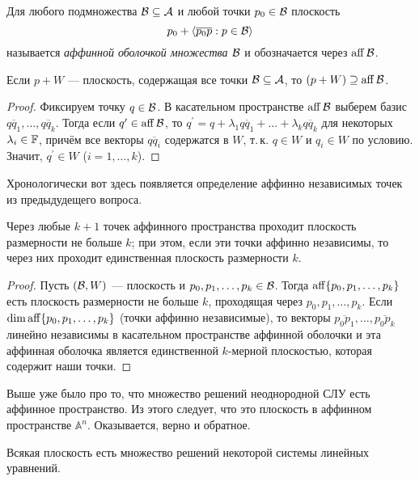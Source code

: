 \begin{definition}
    Для любого подмножества $\mathcal{B} \subseteq \mathcal{A}$ и любой точки $p_0 \in \mathcal{B}$ плоскость
    \[
        p_0 + \langle\overline{p_0p} : p \in \mathcal{B}\rangle
    \]
    называется \textit{аффинной оболочкой множества $\mathcal{B}$} и обозначается через $\operatorname{aff}\mathcal{B}$.
\end{definition}

\begin{proposal}
    Если $p + W$ --- плоскость, содержащая все точки $\mathcal{B} \subseteq \mathcal{A}$, то $(p + W) \supseteq \operatorname{aff}\mathcal{B}$.
\end{proposal}

\begin{proof}
    Фиксируем точку $q \in \mathcal{B}$. В касательном пространстве $\operatorname{aff}\mathcal{B}$ выберем базис $\overline{qq_1}, \ldots, \overline{qq_k}$. Тогда если $q^\prime \in \operatorname{aff}\mathcal{B}$, то $q^\prime = q + \lambda_1\overline{qq_1} + \ldots + \lambda_k\overline{qq_k}$ для некоторых $\lambda_i \in \mathbb{F}$, причём все векторы $\overline{qq_i}$ содержатся в $W$, т.\,к. $q \in W$ и $q_i \in W$ по условию. Значит, $q^\prime \in W$ ($i = 1, \ldots, k$).
\end{proof}

Хронологически вот здесь появляется определение аффинно независимых точек из предыдудещего вопроса.

\begin{theorem}
    Через любые $k + 1$ точек аффинного пространства проходит плоскость размерности не больше $k$; при этом, если эти точки аффинно независимы, то через них проходит единственная плоскость размерности $k$.
\end{theorem}

\begin{proof}
    Пусть $(\mathcal{B}, W)$ --- плоскость и $p_0, p_1, \ldots, p_k \in \mathcal{B}$. Тогда $\operatorname{aff}\{p_0, p_1, \ldots, p_k\}$ есть плоскость размерности не больше $k$, проходящая через $p_0, p_1, \ldots, p_k$. Если $\dim\operatorname{aff}\{p_0, p_1, \ldots, p_k\}$ (точки аффинно независимые), то векторы $\overline{p_0p_1}, \ldots, \overline{p_0p_k}$ линейно независимы в касательном пространстве аффинной оболочки и эта аффинная оболочка является единственной $k$-мерной плоскостью, которая содержит наши точки.
\end{proof}

Выше уже было про то, что множество решений неоднородной СЛУ есть аффинное пространство. Из этого следует, что это плоскость в аффинном пространстве $\mathbb{A}^n$. Оказывается, верно и обратное.

\begin{theorem}
    Всякая плоскость есть множество решений некоторой системы линейных уравнений.
\end{theorem}

